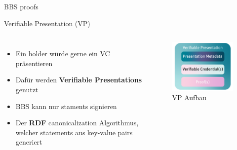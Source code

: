 \documentclass[
	german,%
	authorontitle=true,
	]{bfhbeamer}
\begin{document}
\begin{frame}{BBS proofs}
    
\end{frame}


\begin{frame}{Verifiable Presentation (VP)}
    \begin{columns}[onlytextwidth,T]
        \column{70mm}  
        \begin{itemize}
            \item Ein holder würde gerne ein VC präsentieren
            \item Dafür werden \textbf{Verifiable Presentations} genutzt
            \item BBS kann nur staments signieren
            \item Der \textbf{RDF} canonicalization Algorithmus, welcher statements aus key-value pairs generiert
        \end{itemize}

        \column{70mm}

        \begin{figure}
            \centering
            \includegraphics[width=70mm]{../img/VP.png}
            \caption{VP Aufbau}
        \end{figure}

    \end{columns}
\end{frame}
\end{document}
